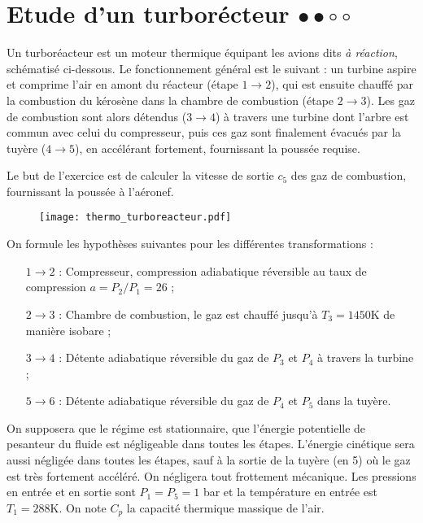 \newpage	

\section{Etude d'un turborécteur $\bullet\bullet\circ\circ$}

Un turboréacteur est un moteur thermique équipant les avions dits \textit{à réaction}, schématisé ci-dessous. Le fonctionnement général est le suivant : un turbine aspire et comprime l'air en amont du réacteur (étape $1\rightarrow2$), qui est ensuite chauffé par la combustion du kérosène dans la chambre de combustion (étape $2\rightarrow3$). Les gaz de combustion sont alors détendus ($3\rightarrow4$) à travers une turbine dont l'arbre est commun avec celui du compresseur, puis ces gaz sont finalement évacués par la tuyère ($4\rightarrow5$), en accélérant fortement, fournissant la poussée requise.

Le but de l'exercice est de calculer la vitesse de sortie $c_5$ des gaz de combustion, fournissant la poussée à l'aéronef.

\begin{figure}[!h]
\centering
	\texttt{[image: thermo\_turboreacteur.pdf]}
\end{figure}

On formule les hypothèses suivantes pour les différentes transformations :
\begin{itemize}

	\item[$1\rightarrow2$ :] Compresseur, compression adiabatique réversible au taux de compression $a=P_2/P_1=26$ ;
	\item[$2\rightarrow3$ :] Chambre de combustion, le gaz est chauffé jusqu'à $T_3=1450$K de manière isobare ;
	\item[$3\rightarrow4$ :] Détente adiabatique réversible du gaz de $P_3$ et $P_4$ à travers la turbine ;
	\item[$5\rightarrow6$ :] Détente adiabatique réversible du gaz de $P_4$ et $P_5$ dans la tuyère.

\end{itemize}

On supposera que le régime est stationnaire, que l'énergie potentielle de pesanteur du fluide est négligeable dans toutes les étapes. L'énergie cinétique sera aussi négligée dans toutes les étapes, sauf à la sortie de la tuyère (en 5) où le gaz est très fortement accéléré. On négligera tout frottement mécanique. Les pressions en entrée et en sortie sont $P_1=P_5=1$ bar et la température en entrée est $T_1=288$K. On note $C_p$ la capacité thermique massique de l'air.

